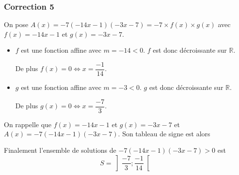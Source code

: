 \documentclass[15pt, mathserif]{beamer}
\begin{document}
\begin{frame}
\vspace{-10mm}
	\frametitle{Correction 5}
On pose $A(x) = -7(-14x-1)(-3x-7) = -7\times f(x) \times g(x)$ avec $f(x) = -14x-1$ et $g(x) = -3x-7$.

\begin{itemize}
	\item $f$ est une fonction affine avec $m =-14<0$. $f$ est donc décroissante sur $\mathbb{R}$.

	 De plus $f(x) = 0 \Leftrightarrow x = \dfrac{-1}{14}$.
	\item $g$ est une fonction affine avec $m =-3<0$. $g$ est donc décroissante sur $\mathbb{R}$.

	 De plus $g(x) = 0 \Leftrightarrow x = \dfrac{-7}{3}$.
\end{itemize}

 \end{frame}


\begin{frame}On rappelle que $f(x) = -14x-1$ et $g(x) = -3x-7$ et $A(x) = -7(-14x-1)(-3x-7)$. Son tableau de signe est alors 

\medskip \hfil
{}

 Finalement l'ensemble de solutions de $-7(-14x-1)(-3x-7)>0$ est\[S = \left]\dfrac{-7}{3};\dfrac{-1}{14}\right[\]

\end{frame}
\end{document}
